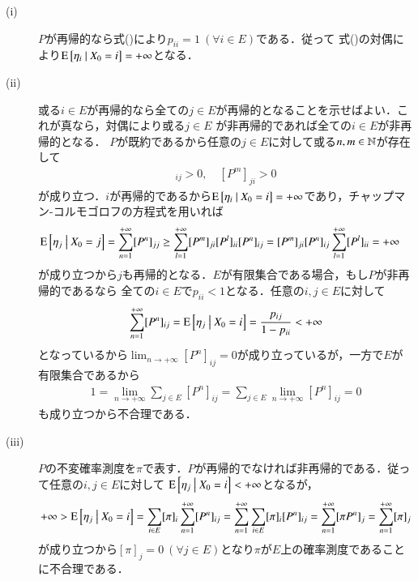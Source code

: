 	\begin{prf}\mbox{}
		\begin{description}
			\item[\rm{(i)}] 
				$P$が再帰的なら式()により$p_{ii}=1\ (\forall i \in E)$である．従って
				式()の対偶により$\operatorname{E} \left[ \eta_i \ \middle|\ X_0 = i \right] = +\infty$となる．
			\item[\rm{(ii)}] 
				或る$i \in E$が再帰的なら全ての$j \in E$が再帰的となることを示せばよい．これが真なら，対偶により或る$j \in E$
				が非再帰的であれば全ての$i \in E$が非再帰的となる．
				$P$が既約であるから任意の$j \in E$に対して或る$n,m \in \mathbb{N}$が存在して
				\begin{align}
					[P^n]_{ij} > 0, \quad [P^m]_{ji} > 0
				\end{align}
				が成り立つ．$i$が再帰的であるから$\operatorname{E} \left[ \eta_i \ \middle|\ X_0 = i \right] = +\infty$であり，チャップマン-コルモゴロフの方程式を用いれば
				\begin{align}
					\operatorname{E} \left[ \eta_j \ \middle|\ X_0 = j \right] &= \sum_{n=1}^{+\infty} [P^n]_{jj} 
					\geq \sum_{l=1}^{+\infty} [P^m]_{ji}[P^l]_{ii}[P^n]_{ij} 
					= [P^m]_{ji}[P^n]_{ij}\sum_{l=1}^{+\infty}[P^l]_{ii} = +\infty
				\end{align}
				が成り立つから$j$も再帰的となる．$E$が有限集合である場合，もし$P$が非再帰的であるなら
				全ての$i \in E$で$p_{ii} < 1$となる．任意の$i,j \in E$に対して
				\begin{align}
					\sum_{n=1}^{+\infty} [P^n]_{ij} = \operatorname{E} \left[ \eta_j \ \middle|\ X_0 = i \right] = \frac{p_{ij}}{1 - p_{ii}} < +\infty
				\end{align}
				となっているから$\displaystyle \lim_{n \to +\infty} [P^n]_{ij} = 0$が成り立っているが，一方で$E$が有限集合であるから
				\begin{align}
					1 = \lim_{n \to +\infty} \sum_{j \in E} [P^n]_{ij} = \sum_{j \in E} \lim_{n \to +\infty} [P^n]_{ij} = 0
				\end{align}
				も成り立つから不合理である．
			\item[\rm{(iii)}]
				$P$の不変確率測度を$\pi$で表す．$P$が再帰的でなければ非再帰的である．従って任意の$i,j \in E$に対して
				$\operatorname{E} \left[ \eta_j \ \middle|\ X_0 = i \right] < +\infty$となるが，
				\begin{align}
					+\infty > \operatorname{E} \left[ \eta_j \ \middle|\ X_0 = i \right] = \sum_{i \in E} [\pi]_i \sum_{n=1}^{+\infty} [P^n]_{ij} = \sum_{n=1}^{+\infty} \sum_{i \in E} [\pi]_i [P^n]_{ij} = \sum_{n=1}^{+\infty} [\pi P^n]_{j}
					= \sum_{n=1}^{+\infty} [\pi]_{j}
				\end{align}
				が成り立つから$[\pi]_{j} = 0\ (\forall j \in E)$となり$\pi$が$E$上の確率測度であることに不合理である．

\end{description}
\end{prf}
